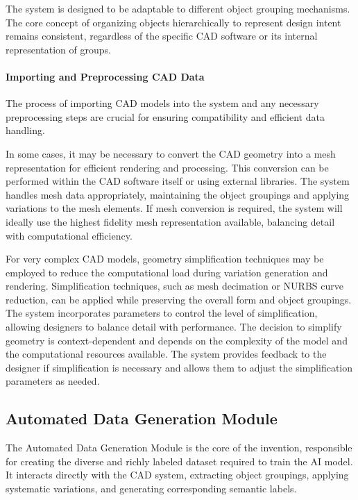 \documentclass[12pt]{report}
\begin{document}
The system is designed to be adaptable to different object grouping mechanisms. The core concept of organizing objects hierarchically to represent design intent remains consistent, regardless of the specific CAD software or its internal representation of groups.

\paragraph{Importing and Preprocessing CAD Data}
The process of importing CAD models into the system and any necessary preprocessing steps are crucial for ensuring compatibility and efficient data handling.

In some cases, it may be necessary to convert the CAD geometry into a mesh representation for efficient rendering and processing. This conversion can be performed within the CAD software itself or using external libraries. The system handles mesh data appropriately, maintaining the object groupings and applying variations to the mesh elements. If mesh conversion is required, the system will ideally use the highest fidelity mesh representation available, balancing detail with computational efficiency.

For very complex CAD models, geometry simplification techniques may be employed to reduce the computational load during variation generation and rendering. Simplification techniques, such as mesh decimation or NURBS curve reduction, can be applied while preserving the overall form and object groupings. The system incorporates parameters to control the level of simplification, allowing designers to balance detail with performance. The decision to simplify geometry is context-dependent and depends on the complexity of the model and the computational resources available. The system provides feedback to the designer if simplification is necessary and allows them to adjust the simplification parameters as needed.

\subsection{Automated Data Generation Module}

The Automated Data Generation Module is the core of the invention, responsible for creating the diverse and richly labeled dataset required to train the AI model. It interacts directly with the CAD system, extracting object groupings, applying systematic variations, and generating corresponding semantic labels.
\end{document}
